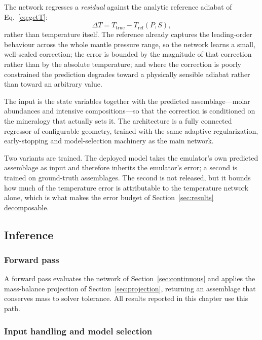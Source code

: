 The network regresses a \emph{residual} against the analytic reference adiabat of
Eq.~\eqref{eq:getT}:
\begin{equation}
  \Delta T = T_{\mathrm{true}} - T_{\mathrm{ref}}(P,S),
\end{equation}
rather than temperature itself. The reference already captures the leading-order
behaviour across the whole mantle pressure range, so the network learns a small,
well-scaled correction; the error is bounded by the magnitude of that correction
rather than by the absolute temperature; and where the correction is poorly
constrained the prediction degrades toward a physically sensible adiabat rather than
toward an arbitrary value.

The input is the state variables together with the predicted assemblage---molar
abundances and intensive compositions---so that the correction is conditioned on the
mineralogy that actually sets it. The architecture is a fully connected regressor of
configurable geometry, trained with the same adaptive-regularization, early-stopping
and model-selection machinery as the main network.

Two variants are trained. The deployed model takes the emulator's own predicted
assemblage as input and therefore inherits the emulator's error; a second is trained
on ground-truth assemblages. The second is not released, but it bounds how much of
the temperature error is attributable to the temperature network alone, which is what
makes the error budget of Section~\ref{sec:results} decomposable.

\subsection{Inference}
\label{sec:inference}

\subsubsection{Forward pass}

A forward pass evaluates the network of Section~\ref{sec:continuous} and applies the
mass-balance projection of Section~\ref{sec:projection}, returning an assemblage that
conserves mass to solver tolerance. All results reported in this chapter use this
path.

\subsubsection{Input handling and model selection}


